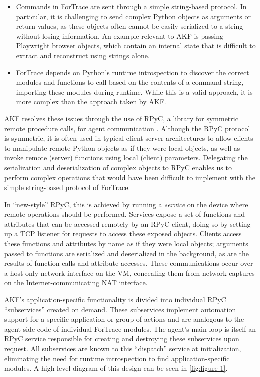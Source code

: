 \begin{itemize}
\item
  Commands in ForTrace are sent through a simple string-based protocol.
  In particular, it is challenging to send complex Python objects as
  arguments or return values, as these objects often cannot be easily
  serialized to a string without losing information. An example relevant
  to AKF is passing Playwright browser objects, which contain an
  internal state that is difficult to extract and reconstruct using
  strings alone.
\item
  ForTrace depends on Python's runtime introspection to discover the
  correct modules and functions to call based on the contents of a
  command string, importing these modules during runtime. While this is
  a valid approach, it is more complex than the approach taken by AKF.
\end{itemize}

AKF resolves these issues through the use of RPyC, a library for
symmetric remote procedure calls, for agent communication
\citep{TomerfilibaorgRpyc2025}. Although the RPyC protocol is
symmetric, it is often used in typical client-server architectures to
allow clients to manipulate remote Python objects as if they were local
objects, as well as invoke remote (server) functions using local
(client) parameters. Delegating the serialization and deserialization of
complex objects to RPyC enables us to perform complex operations that
would have been difficult to implement with the simple string-based
protocol of ForTrace.

In ``new-style'' RPyC, this is achieved by running a \emph{service} on
the device where remote operations should be performed. Services expose
a set of functions and attributes that can be accessed remotely by an
RPyC client, doing so by setting up a TCP listener for requests to
access these exposed objects. Clients access these functions and
attributes by name as if they were local objects; arguments passed to
functions are serialized and deserialized in the background, as are the
results of function calls and attribute accesses. These communications
occur over a host-only network interface on the VM, concealing them from
network captures on the Internet-communicating NAT interface.

AKF's application-specific functionality is divided into individual RPyC
``subservices'' created on demand. These subservices implement
automation support for a specific application or group of actions and
are analogous to the agent-side code of individual ForTrace modules. The
agent's main loop is itself an RPyC service responsible for creating and
destroying these subservices upon request. All subservices are known to
this ``dispatch'' service at initialization, eliminating the need for
runtime introspection to find application-specific modules. A high-level
diagram of this design can be seen in \autoref{fig:figure-1}.

